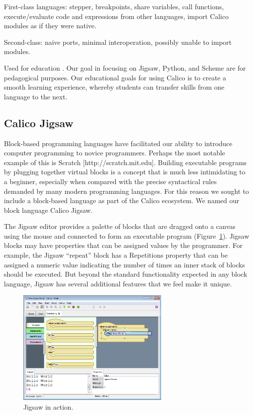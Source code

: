 \documentclass[preprint]{sigplanconf}
\begin{document}
First-class languages: stepper, breakpoints, share variables, call
functions, execute/evaluate code and expressions from other languages,
import Calico modules as if they were native.

Second-class: naive ports, minimal interoperation, possibly unable to
import modules.

Used for education \cite{blank-etal-2012, blank-ohara-2013}. Our goal
in focusing on Jigsaw, Python, and Scheme are for pedagogical
purposes. Our educational goals for using Calico is to create a smooth
learning experience, whereby students can transfer skills from one
language to the next.

\subsection{Calico Jigsaw}

Block-based programming languages have facilitated our ability to
introduce computer programming to novice programmers. Perhaps the most
notable example of this is Scratch [http://scratch.mit.edu]. Building
executable programs by plugging together virtual blocks is a concept
that is much less intimidating to a beginner, especially when
compared with the precise syntactical rules demanded by many modern
programming languages. For this reason we sought to include a
block-based language as part of the Calico ecosystem. We named our
block language Calico Jigsaw.

The Jigsaw editor provides a palette of blocks that are dragged onto a
canvas using the mouse and connected to form an executable program
(Figure~\ref{jigsaw1}). Jigsaw blocks may have properties that can be assigned
values by the programmer. For example, the Jigsaw ``repeat'' block has
a Repetitions property that can be assigned a numeric value indicating
the number of times an inner stack of blocks should be executed. But
beyond the standard functionality expected in any block language,
Jigsaw has several additional features that we feel make it unique.

\begin{figure}[h!]
  \centering
     \includegraphics[width=75mm]{jigsaw1.eps}
  \caption{Jigsaw in action.}
  \label{jigsaw1}
\end{figure}
\end{document}
